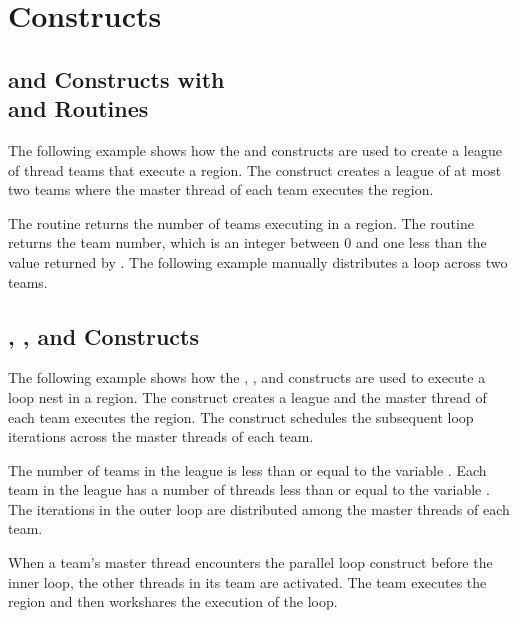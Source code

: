 \pagebreak
\chapter{ Constructs}
\label{chap:teams}

\section{ and  Constructs with \\
and  Routines}

The following example shows how the  and  constructs 
are used to create a league of thread teams that execute a region. The  
construct creates a league of at most two teams where the master thread of each 
team executes the  region.

The  routine returns the number of teams executing in a  
region. The  routine returns the team number, which is an integer 
between 0 and one less than the value returned by . The following 
example manually distributes a loop across two teams.



\section{, , and  Constructs}

The following example shows how the , , and  
constructs are used to execute a loop nest in a  region. The  
construct creates a league and the master thread of each team executes the  
region. The  construct schedules the subsequent loop iterations 
across the master threads of each team.

The number of teams in the league is less than or equal to the variable . 
Each team in the league has a number of threads less than or equal to the variable 
. The iterations in the outer loop are distributed among the master 
threads of each team.

When a team's master thread encounters the parallel loop construct before the inner 
loop, the other threads in its team are activated. The team executes the  
region and then workshares the execution of the loop.

